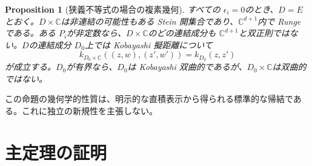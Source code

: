 \documentclass[12pt]{amsart}
\newtheorem{prop}[thm]{Proposition}
\theoremstyle{definition}
\theoremstyle{remark}
\numberwithin{equation}{section}
\newcommand{\C}{\mathbb{C}}
\begin{document}
\begin{prop}[狭義不等式の場合の複素幾何]\label{prop:geometry-ja}
すべての \allowbreak$\epsilon_i=0$\allowbreak のとき、\allowbreak$D=E$\allowbreak とおく。\allowbreak$D\times\C$\allowbreak は非連結の可能性もある Stein 開集合であり、\allowbreak$\C^{d+1}$\allowbreak 内で Runge である。ある \allowbreak$P_i$\allowbreak が非定数なら、\allowbreak$D\times\C$\allowbreak のどの連結成分も \allowbreak$\C^{d+1}$\allowbreak と双正則ではない。\allowbreak$D$\allowbreak の連結成分 \allowbreak$D_0$\allowbreak 上では Kobayashi 擬距離について
\begin{equation}\label{eq:kobayashi-ja}
k_{D_0\times\C}((z,w),(z',w'))=k_{D_0}(z,z')
\end{equation}
が成立する。\allowbreak$D_0$\allowbreak が有界なら、\allowbreak$D_0$\allowbreak は Kobayashi 双曲的であるが、\allowbreak$D_0\times\C$\allowbreak は双曲的ではない。
\end{prop}
この命題の幾何学的性質は、明示的な直積表示から得られる標準的な帰結である。これに独立の新規性を主張しない。

\section{主定理の証明}
\end{document}
